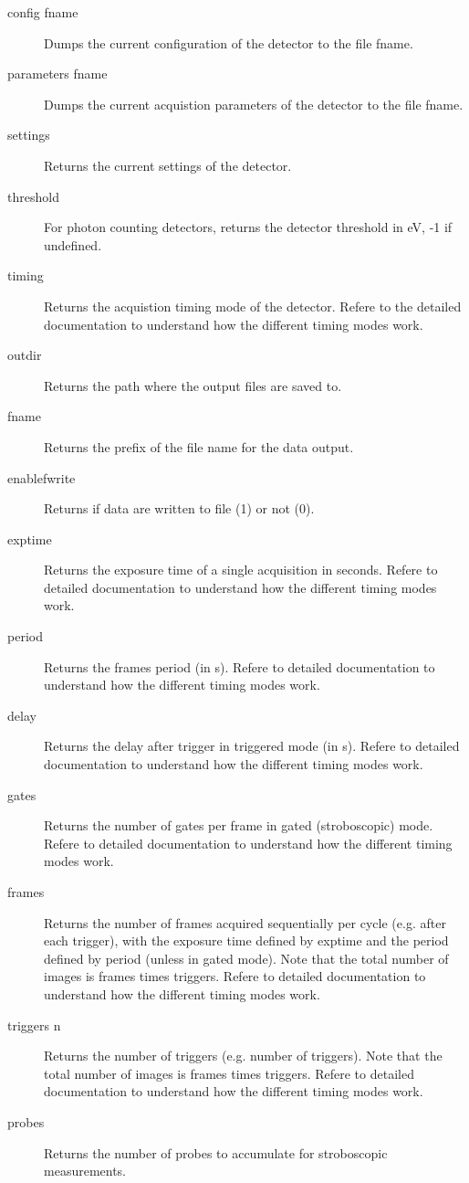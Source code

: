 \documentclass{article}
\begin{document}
\begin{description}
\item[config fname] 
Dumps the current configuration of the detector to the file fname.
\item[parameters fname]
 Dumps the current acquistion parameters of the detector to the file fname.
\item[settings] 
Returns the current settings of the detector.
\item[threshold] 
For photon counting detectors, returns the detector threshold in eV, -1 if undefined.
\item[timing]   
Returns the acquistion timing mode of the detector.
Refere to the detailed documentation to understand how the different timing modes work.
\item[outdir] 
Returns the path where the output files are saved to.
\item[fname]
Returns the prefix of the file name for the data output.
\item[enablefwrite] Returns if data are written to file (1) or not (0).
\item[exptime] 
Returns the exposure time of a single acquisition in seconds. 
Refere to detailed documentation to understand how the different timing modes work. 
\item[period]  
Returns the frames period (in s). 
Refere to detailed documentation to understand how the different timing modes work.
\item[delay] 
Returns the delay after trigger in triggered mode (in s). 
Refere to detailed documentation to understand how the different timing modes work.
\item[gates] 
Returns the number of gates per frame in gated (stroboscopic) mode. 
Refere to detailed documentation to understand how the different timing modes work.
\item[frames]  
Returns the number of frames acquired sequentially per cycle (e.g. after each trigger), with the exposure time defined by exptime and the period defined by period (unless in gated mode).
Note that the total number of images is  frames times triggers.  
Refere to detailed documentation to understand how the different timing modes work. 
\item[triggers n] 
Returns the number of triggers (e.g. number of triggers). 
Note that the total number of images is  frames times triggers. 
Refere to detailed documentation to understand how the different timing modes work.  
\item[probes]  Returns the number of probes to accumulate for stroboscopic measurements.  

\end{description}
\end{document}
